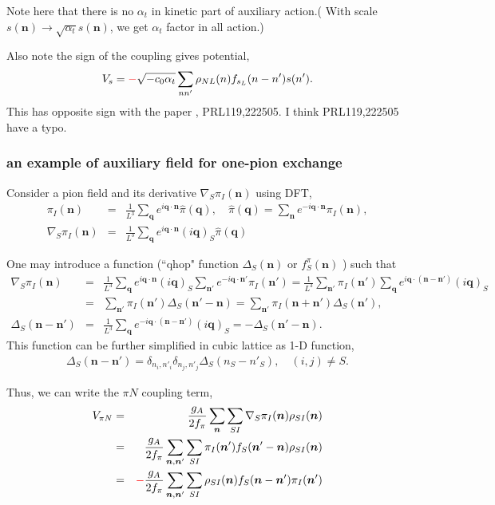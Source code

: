 \documentclass[10pt]{book}
\def\bm{\boldsymbol}
\newcommand{\bea}{\begin{eqnarray}}
\newcommand{\eea}{\end{eqnarray}}
\newcommand{\no}{\nonumber \\}
\def\vn{{\bm n}}
\def\vq{{\bm q}}
\begin{document}
Note here that there is no $\alpha_t$ in kinetic part of auxiliary action.(
With scale $s(\vn)\to \sqrt{\alpha_t}s(\vn)$, we get $\alpha_t$ factor in all action.) 

Also note the sign of the coupling gives potential,
\bea 
V_{s}={\color{red}-}\sqrt{-c_0\alpha_t}\sum_{n n'}\rho_{NL}(n)f_{s_L}(n-n')s(n').
\eea 
This has opposite sign with the paper , PRL119,222505. I think PRL119,222505 have a typo.   

\subsubsection{an example of auxiliary field for one-pion exchange}

Consider a pion field and its derivative $\nabla_S \pi_I(\vn)$ using DFT,
\bea 
\pi_I(\vn)&=&\frac{1}{L^3}\sum_\vq e^{i\vq\cdot\vn}\hat{\pi}(\vq), \quad 
\hat{\pi}(\vq)=\sum_{\vn} e^{-i\vq\cdot\vn}\pi_I(\vn), \no 
\nabla_S \pi_I(\vn) &=& \frac{1}{L^3}\sum_\vq e^{i\vq\cdot\vn}(i\vq)_S \hat{\pi}(\vq)
\eea 

One may introduce a function (``qhop" function $\Delta_S(\vn)$ or $f_S^\pi(\vn)$   ) such that 
\bea 
\nabla_S \pi_I(\vn) &=& \frac{1}{L^3}\sum_\vq e^{i\vq\cdot\vn}(i\vq)_S 
                        \sum_{\vn'} e^{-i\vq\cdot\vn'}\pi_I(\vn') 
                    =  \frac{1}{L^3}\sum_{\vn'} \pi_I(\vn') 
                    \sum_\vq e^{i\vq\cdot(\vn-\vn')}(i\vq)_S \no 
                    &=& \sum_{\vn'} \pi_I(\vn')\Delta_S(\vn'-\vn)=\sum_{\vn'} \pi_I(\vn+\vn')\Delta_S(\vn'),\no 
\Delta_S(\vn-\vn')&=&  \frac{1}{L^3} \sum_\vq e^{-i\vq\cdot(\vn-\vn')}(i\vq)_S 
                   =  -\Delta_S(\vn'-\vn).
\eea 
This function can be further simplified in cubic lattice as 1-D function,
\bea 
\Delta_S(\vn-\vn')=\delta_{n_i,n'_i}\delta_{n_j,n'_j}  \Delta_S(n_S-n'_S),\quad (i,j)\neq S.
\eea 


Thus, we can write the $\pi N$ coupling term,
\bea 
V_{\pi N}&=&\frac{g_A}{2f_\pi}\sum_\vn\sum_{SI} \nabla_S \pi_I(\vn)\rho_{SI}(\vn) \no 
         &=& \frac{g_A}{2f_\pi}\sum_{\vn,\vn'}\sum_{SI} \pi_I(\vn')f_S(\vn'-\vn)\rho_{SI}(\vn) \no 
         &=& {\color{red}-}\frac{g_A}{2f_\pi}\sum_{\vn,\vn'}\sum_{SI} \rho_{SI}(\vn) f_S(\vn-\vn') \pi_I(\vn')
\eea 
\end{document}
